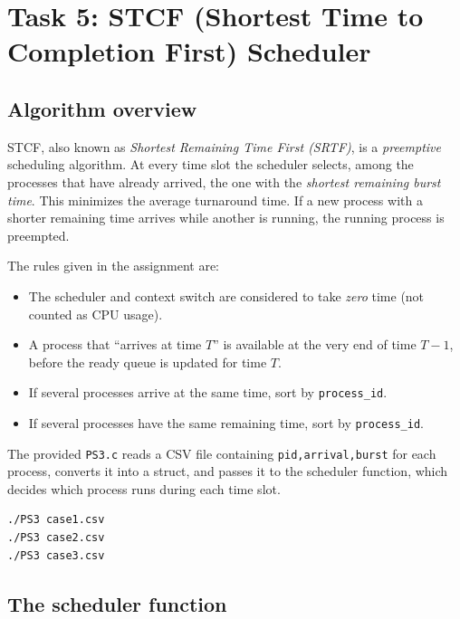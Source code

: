 \documentclass[11pt,a4paper]{article}
\begin{document}
\section{Task 5: STCF (Shortest Time to Completion First) Scheduler}

\subsection{Algorithm overview}

STCF, also known as \emph{Shortest Remaining Time First (SRTF)}, is a \emph{preemptive}
scheduling algorithm. At every time slot the scheduler selects, among the processes that have
already arrived, the one with the \emph{shortest remaining burst time}. This minimizes the
average turnaround time. If a new process with a shorter remaining time arrives while another
is running, the running process is preempted.

The rules given in the assignment are:
\begin{itemize}[leftmargin=2em]
  \item The scheduler and context switch are considered to take \emph{zero} time (not counted
        as CPU usage).
  \item A process that ``arrives at time $T$'' is available at the very end of time $T-1$,
        before the ready queue is updated for time $T$.
  \item If several processes arrive at the same time, sort by \texttt{process\_id}.
  \item If several processes have the same remaining time, sort by \texttt{process\_id}.
\end{itemize}

The provided \texttt{PS3.c} reads a CSV file containing \texttt{pid,arrival,burst} for each
process, converts it into a struct, and passes it to the scheduler function, which decides
which process runs during each time slot.

\begin{lstlisting}[style=bashstyle]
./PS3 case1.csv
./PS3 case2.csv
./PS3 case3.csv
\end{lstlisting}

\subsection{The scheduler function}
\end{document}

